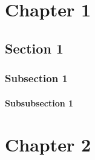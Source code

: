 \chapter{Chapter 1}
\blindtext[2]
\section{Section 1}
\blindtext[1]
\subsection{Subsection 1}
\blindtext[1]
\subsubsection{Subsubsection 1}
\blindtext[1]
\chapter{Chapter 2}
\blindtext[3]